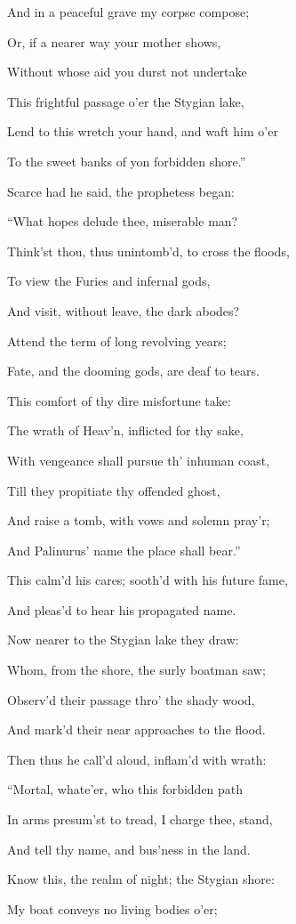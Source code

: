 And in a peaceful grave my corpse compose;

Or, if a nearer way your mother shows,

Without whose aid you durst not undertake

This frightful passage o’er the Stygian lake,

Lend to this wretch your hand, and waft him o’er

To the sweet banks of yon forbidden shore.”

Scarce had he said, the prophetess began:

“What hopes delude thee, miserable man?

Think’st thou, thus unintomb’d, to cross the floods,

To view the Furies and infernal gods,

And visit, without leave, the dark abodes?

Attend the term of long revolving years;

Fate, and the dooming gods, are deaf to tears.

This comfort of thy dire misfortune take:

The wrath of Heav’n, inflicted for thy sake,

With vengeance shall pursue th’ inhuman coast,

Till they propitiate thy offended ghost,

And raise a tomb, with vows and solemn pray’r;

And Palinurus’ name the place shall bear.”

This calm’d his cares; sooth’d with his future fame,

And pleas’d to hear his propagated name.

Now nearer to the Stygian lake they draw:

Whom, from the shore, the surly boatman saw;

Observ’d their passage thro’ the shady wood,

And mark’d their near approaches to the flood.

Then thus he call’d aloud, inflam’d with wrath:

“Mortal, whate’er, who this forbidden path

In arms presum’st to tread, I charge thee, stand,

And tell thy name, and bus’ness in the land.

Know this, the realm of night; the Stygian shore:

My boat conveys no living bodies o’er;

